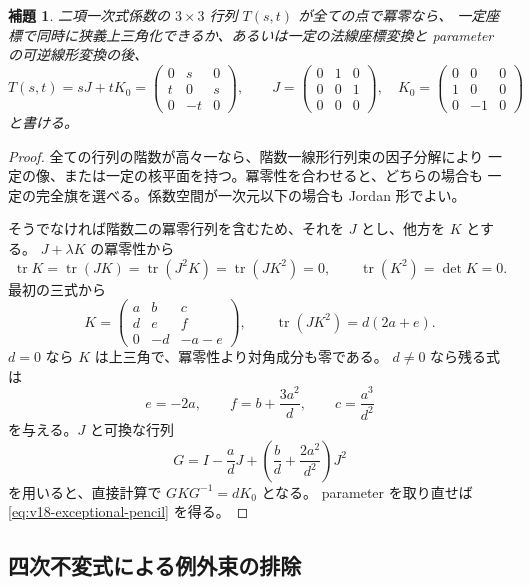 \documentclass[11pt,a4paper]{ltjsarticle}
\newtheorem{lemma}[theorem]{補題}
\theoremstyle{remark}\newtheorem{remark}[theorem]{注意}
\begin{document}
\begin{lemma}\label{lem:v18-nilpotent-pencil}
二項一次式係数の $3\times3$ 行列 $T(s,t)$ が全ての点で冪零なら、
一定座標で同時に狭義上三角化できるか、あるいは一定の法線座標変換と
parameter の可逆線形変換の後、
\begin{equation}\label{eq:v18-exceptional-pencil}
 T(s,t)=sJ+tK_0
 =\begin{pmatrix}0&s&0\\t&0&s\\0&-t&0\end{pmatrix},\qquad
 J=\begin{pmatrix}0&1&0\\0&0&1\\0&0&0\end{pmatrix},\quad
 K_0=\begin{pmatrix}0&0&0\\1&0&0\\0&-1&0\end{pmatrix}
\end{equation}
と書ける。
\end{lemma}
\begin{proof}
全ての行列の階数が高々一なら、階数一線形行列束の因子分解により
一定の像、または一定の核平面を持つ。冪零性を合わせると、どちらの場合も
一定の完全旗を選べる。係数空間が一次元以下の場合も Jordan 形でよい。

そうでなければ階数二の冪零行列を含むため、それを $J$ とし、他方を $K$ とする。
$J+\lambda K$ の冪零性から
\[
 \operatorname{tr}K=\operatorname{tr}(JK)
 =\operatorname{tr}(J^2K)=\operatorname{tr}(JK^2)=0,
 \qquad \operatorname{tr}(K^2)=\det K=0.
\]
最初の三式から
\[
 K=\begin{pmatrix}a&b&c\\d&e&f\\0&-d&-a-e\end{pmatrix},
 \qquad \operatorname{tr}(JK^2)=d(2a+e).
\]
$d=0$ なら $K$ は上三角で、冪零性より対角成分も零である。
$d\ne0$ なら残る式は
\[
 e=-2a,\qquad f=b+\frac{3a^2}{d},\qquad c=\frac{a^3}{d^2}
\]
を与える。$J$ と可換な行列
\[
 G=I-\frac adJ+\left(\frac bd+\frac{2a^2}{d^2}\right)J^2
\]
を用いると、直接計算で $GKG^{-1}=dK_0$ となる。
parameter を取り直せば \eqref{eq:v18-exceptional-pencil} を得る。
\end{proof}

\subsection{四次不変式による例外束の排除}
\end{document}
